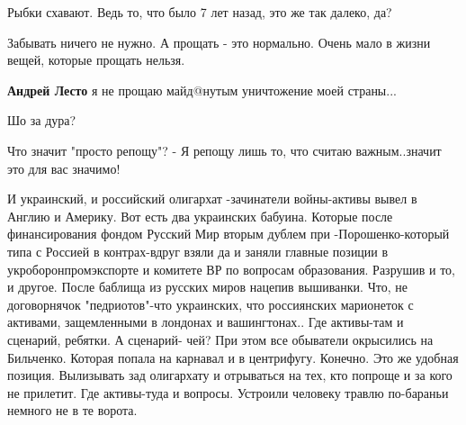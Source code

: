 \begin{itemize}
Рыбки схавают. Ведь то, что было 7 лет назад, это же так далеко, да?

 
Забывать ничего не нужно.
А прощать - это нормально. Очень мало в жизни вещей, которые прощать нельзя.

\begin{itemize} %
 
\textbf{Андрей Лесто} я не прощаю майд@нутым уничтожение моей страны...

 
Шо за дура?
\end{itemize} %

 
Что значит "просто репощу"? - Я репощу лишь то, что считаю важным..значит это для вас значимо!

 

И украинский, и российский олигархат -зачинатели войны-активы вывел в Англию и
Америку. Вот есть два украинских бабуина. Которые после финансирования фондом
Русский Мир вторым дублем при -Порошенко-который типа с Россией в контрах-вдруг
взяли да и заняли главные позиции в укроборонпромэкспорте и комитете ВР по
вопросам образования. Разрушив и то, и другое. После баблища из русских миров
нацепив вышиванки. Что, не договорнячок "педриотов"-что украинских, что
россиянских марионеток с активами, защемленными в лондонах и вашингтонах.. Где
активы-там и сценарий, ребятки. А сценарий- чей? При этом все обыватели
окрысились на Бильченко. Которая попала на карнавал и в центрифугу. Конечно.
Это же удобная позиция. Вылизывать зад олигархату и отрываться на тех, кто
попроще и за кого не прилетит. Где активы-туда и вопросы. Устроили человеку
травлю по-бараньи немного не в те ворота.


\end{itemize}
